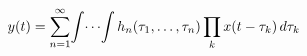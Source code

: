\documentclass[preview]{standalone}
\begin{document}
\begin{align*}
\special{dvisvgm:raw <g id='unique000'>}y(t)=\sum_{n=1}^{\infty}\!\int\!\cdots\!\int h_n(\tau_1,\dots,\tau_n)\prod_k x(t-\tau_k)\,d\tau_k\special{dvisvgm:raw </g>}
\end{align*}
\end{document}
